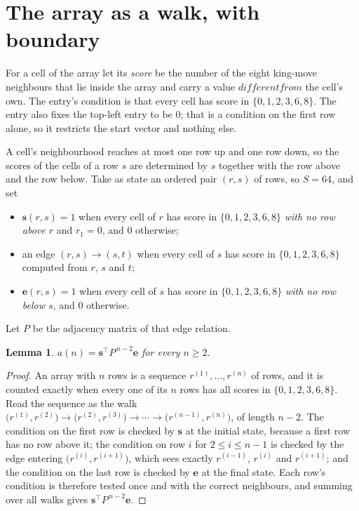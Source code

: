 \documentclass[11pt,a4paper]{article}
\theoremstyle{plain}
\newtheorem{lemma}[theorem]{Lemma}
\theoremstyle{definition}
\begin{document}
\section{The array as a walk, with boundary}

For a cell of the array let its \emph{score} be the number of the eight king-move neighbours that lie inside
the array and carry a value $different from$ the cell's own. The entry's condition is that every cell
has score in $\{0,1,2,3,6,8\}$. The entry also fixes the top-left entry to be $0$; that is a condition on the first row alone, so it restricts the start vector and nothing else.

A cell's neighbourhood reaches at most one row up and one row down, so the scores of the
cells of a row $s$ are determined by $s$ together with the row above and the row below.
Take as state an ordered pair $(r,s)$ of rows, so $S=64$, and set
\begin{itemize}
\item $\mathbf{s}(r,s)=1$ when every cell of $r$ has score in $\{0,1,2,3,6,8\}$ \emph{with no row
above $r$} and $r_1=0$, and $0$ otherwise;
\item an edge $(r,s)\to(s,t)$ when every cell of $s$ has score in $\{0,1,2,3,6,8\}$ computed from
$r$, $s$ and $t$;
\item $\mathbf{e}(r,s)=1$ when every cell of $s$ has score in $\{0,1,2,3,6,8\}$ \emph{with no row
below $s$}, and $0$ otherwise.
\end{itemize}
Let $P$ be the adjacency matrix of that edge relation.

\begin{lemma}\label{lem:walk}
$a(n)=\mathbf{s}^{\!\top}P^{\,n-2}\mathbf{e}$ for every $n\ge2$.
\end{lemma}

\begin{proof}
An array with $n$ rows is a sequence $r^{(1)},\dots,r^{(n)}$ of rows, and it is counted
exactly when every one of its $n$ rows has all scores in $\{0,1,2,3,6,8\}$. Read the sequence as the
walk $\bigl(r^{(1)},r^{(2)}\bigr)\to\bigl(r^{(2)},r^{(3)}\bigr)\to\cdots\to
\bigl(r^{(n-1)},r^{(n)}\bigr)$, of length $n-2$. The condition on the first row is
checked by $\mathbf{s}$ at the initial state, because a first row has no row above it; the
condition on row $i$ for $2\le i\le n-1$ is checked by the edge entering
$\bigl(r^{(i)},r^{(i+1)}\bigr)$, which sees exactly $r^{(i-1)}$, $r^{(i)}$ and
$r^{(i+1)}$; and the condition on the last row is checked by $\mathbf{e}$ at the final
state. Each row's condition is therefore tested once and with the correct neighbours, and
summing over all walks gives $\mathbf{s}^{\!\top}P^{\,n-2}\mathbf{e}$.
\end{proof}
\end{document}
